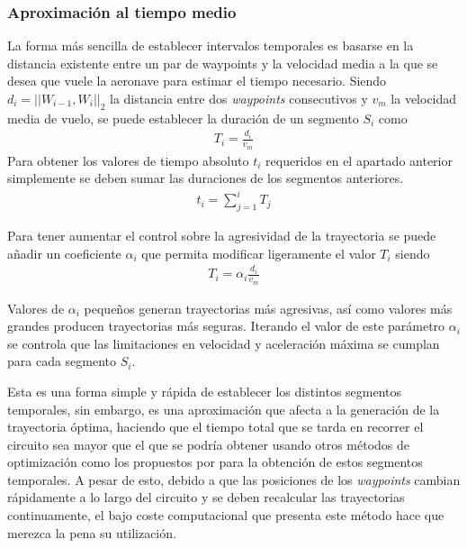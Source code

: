 \subsubsection{Aproximación al tiempo medio}

La forma más sencilla de establecer intervalos temporales es basarse en la distancia existente entre un par de waypoints y la velocidad media a la que se desea que vuele la aeronave para estimar el tiempo necesario. Siendo $d_i = || W_{i-1} , W_{i} ||_2 $ la distancia entre dos \textit{waypoints} consecutivos y $v_m$ la velocidad media de vuelo, se puede establecer la duración de un segmento $S_i$ como
\begin{align}
	T_i = \frac{d_i}{v_m}
\end{align}
Para obtener los valores de tiempo absoluto $t_i$ requeridos en el apartado anterior simplemente se deben sumar las duraciones de los segmentos anteriores.
\begin{align}
t_i = \sum_{j=1}^{i} T_j
\end{align}


Para tener aumentar el control sobre la agresividad de la trayectoria se puede añadir un coeficiente $\alpha_i$ que permita modificar ligeramente el valor $T_i$ siendo 
\begin{align}
	T_i = \alpha_i\frac{d_i}{v_m}
\end{align}

Valores de $\alpha_i$ pequeños generan trayectorias más agresivas, así como valores más grandes producen trayectorias más seguras. Iterando el valor de este parámetro $\alpha_i$ se controla que las limitaciones en velocidad y aceleración máxima se cumplan para cada segmento $S_i$.

Esta es una forma simple y rápida de establecer los distintos segmentos temporales, sin embargo, es una aproximación que afecta a la generación de la trayectoria óptima, haciendo que el tiempo total que se tarda en recorrer el circuito sea mayor que el que se podría obtener usando otros métodos de optimización como los propuestos por  para la obtención de estos segmentos temporales. A pesar de esto, debido a que las posiciones de los \textit{waypoints} cambian rápidamente a lo largo del circuito y se deben recalcular las trayectorias continuamente, el bajo coste computacional que presenta este método hace que merezca la pena su utilización.

